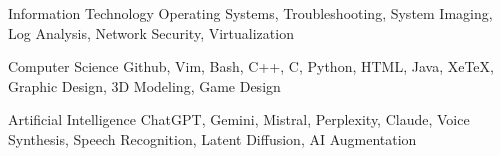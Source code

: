 
\begin{cvskills}
  \cvskill
    {Information Technology} %
    {Operating Systems, Troubleshooting, System Imaging, Log Analysis, Network Security, Virtualization} %

  \cvskill
    {Computer Science} %
    {Github, Vim, Bash, C++, C, Python, HTML, Java, XeTeX, Graphic Design, 3D Modeling, Game Design} %

  \cvskill
    {Artificial Intelligence} %
	{ChatGPT, Gemini, Mistral, Perplexity, Claude, Voice Synthesis, Speech Recognition, Latent Diffusion, AI Augmentation} %

\end{cvskills}

